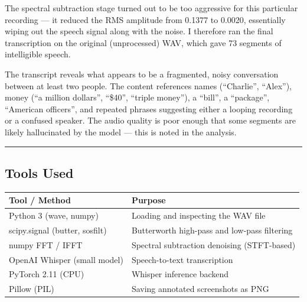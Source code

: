 \documentclass[
]{article}
\begin{document}
The spectral subtraction stage turned out to be too aggressive for this
particular recording --- it reduced the RMS amplitude from 0.1377 to
0.0020, essentially wiping out the speech signal along with the noise. I
therefore ran the final transcription on the original (unprocessed) WAV,
which gave 73 segments of intelligible speech.

The transcript reveals what appears to be a fragmented, noisy
conversation between at least two people. The content references names
(``Charlie'', ``Alex''), money (``a million dollars'', ``\$40'',
``triple money''), a ``bill'', a ``package'', ``American officers'', and
repeated phrases suggesting either a looping recording or a confused
speaker. The audio quality is poor enough that some segments are likely
hallucinated by the model --- this is noted in the analysis.

\begin{center}\rule{0.5\linewidth}{0.5pt}\end{center}

\subsection{Tools Used}\label{tools-used}

\begin{longtable}[]{@{}
  >{\raggedright\arraybackslash}p{}
  >{\raggedright\arraybackslash}p{}@{}}
\toprule\noalign{}
\begin{minipage}[b]{\linewidth}\raggedright
Tool / Method
\end{minipage} & \begin{minipage}[b]{\linewidth}\raggedright
Purpose
\end{minipage} \\
\midrule\noalign{}
\endhead
\bottomrule\noalign{}
\endlastfoot
Python 3 (wave, numpy) & Loading and inspecting the WAV file \\
scipy.signal (butter, sosfilt) & Butterworth high-pass and low-pass
filtering \\
numpy FFT / IFFT & Spectral subtraction denoising (STFT-based) \\
OpenAI Whisper (small model) & Speech-to-text transcription \\
PyTorch 2.11 (CPU) & Whisper inference backend \\
Pillow (PIL) & Saving annotated screenshots as PNG \\
\end{longtable}
\end{document}
